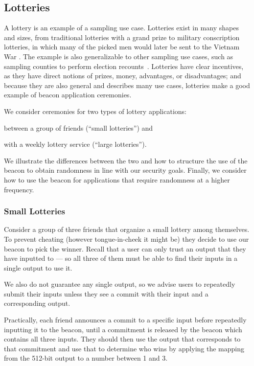 \subsection{Lotteries}
A lottery is an example of a sampling use case.
Lotteries exist in many shapes and sizes, from traditional lotteries with a grand prize to military conscription lotteries, in which many of the picked men would later be sent to the Vietnam War \cite{starr1997nonrandom}.
The example is also generalizable to other sampling use cases, such as sampling counties to perform election recounts~\cite{bushgore}.
Lotteries have clear incentives, as they have direct notions of prizes, money, advantages, or disadvantages; and because they are also general and describes many use cases, lotteries make a good example of beacon application ceremonies.

We consider ceremonies for two types of lottery applications:
\begin{eletterate*}
\item between a group of friends (\enquote{small lotteries}) and
\item with a weekly lottery service (\enquote{large lotteries}).
\end{eletterate*}
We illustrate the differences between the two and how to structure the use of the beacon to obtain randomness in line with our security goals.
Finally, we consider how to use the beacon for applications that require randomness at a higher frequency.

\subsubsection{Small Lotteries}
Consider a group of three friends that organize a small lottery among themselves.
To prevent cheating (however tongue-in-cheek it might be) they decide to use our beacon to pick the winner.
Recall that a user can only trust an output that they have inputted to --- so all three of them must be able to find their inputs in a single output to use it.

We also do not guarantee any single output, so we advise users to repeatedly submit their inputs unless they see a commit with their input and a corresponding output.

Practically, each friend announces a commit to a specific input before repeatedly inputting it to the beacon, until a commitment is released by the beacon which contains all three inputs.
They should then use the output that corresponds to that commitment and use that to determine who wins by applying the mapping from the 512-bit output to a number between 1 and 3.

